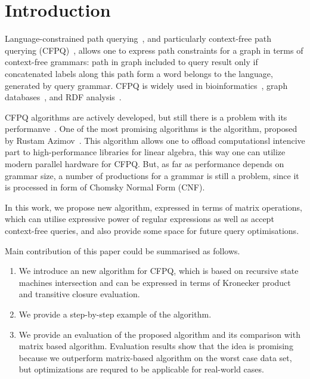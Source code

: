 \section{Introduction}

Language-constrained path querying~\cite{!!!}, and particularly context-free path querying (CFPQ)~\cite{!!!}, allows one to express path constraints for a graph in terms of context-free grammars: path in graph  included to query result only if concatenated labels along this path form a word belongs to the language, generated by query grammar. CFPQ is widely used in bioinformatics~\cite{!!!}, graph databases~\cite{!!!}, and RDF analysis~\cite{!!!}. 

CFPQ algorithms are actively developed, but still there is a problem with its performanve~\cite{10.1145/3335783.3335791}.
One of the most promising algorithms is the algorithm, proposed by Rustam Azimov~\cite{Azimov:2018:CPQ:3210259.3210264}. 
This algorithm allows one to offload computationsl intencive part to high-performance libraries for linear algebra, this way one can utilize modern parallel hardware for CFPQ.
But, as far as performance depends on grammar size, a number of productions for a grammar is still a problem, since it is processed in form of Chomsky Normal Form (CNF). 

In this work, we propose new algorithm, expressed in terms of matrix operations, which can utilise expressive power of regular expressions as well as accept context-free queries, and also provide some space for future query optimisations.

Main contribution of this paper could be summarised as follows.

\begin{enumerate}
\item We introduce an new algorithm for CFPQ, which is based on recursive state machines intersection and can be expressed in terms of Kronecker product and transitive closure evaluation.
\item We provide a step-by-step example of the algorithm.
\item We provide an evaluation of the proposed algorithm and its comparison with matrix based algorithm. Evaluation results show that the idea is promising because we outperform matrix-based algorithm on the worst case data set, but optimizations are requred to be applicable for real-world cases.
\end{enumerate}

